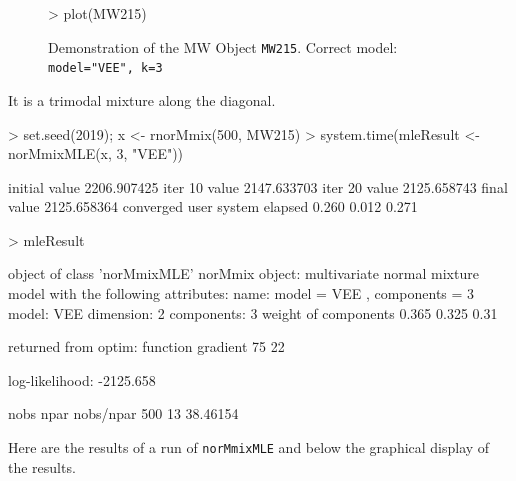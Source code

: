 \begin{figure}
    \begin{Rgraph}[0.9]
\begin{Schunk}
\begin{Sinput}
>     plot(MW215)
\end{Sinput}
\end{Schunk}
    \caption{Demonstration of the MW Object {\tt MW215}. Correct model: 
             {\tt model="VEE", k=3}}
    \label{fig:demoMW}
    \end{Rgraph}
\end{figure}

It is a trimodal mixture along the diagonal.

\begin{Schunk}
\begin{Sinput}
>     set.seed(2019); x <- rnorMmix(500, MW215)
>     system.time(mleResult <- norMmixMLE(x, 3, "VEE"))
\end{Sinput}
\begin{Soutput}
initial  value 2206.907425 
iter  10 value 2147.633703
iter  20 value 2125.658743
final  value 2125.658364 
converged
   user  system elapsed 
  0.260   0.012   0.271 
\end{Soutput}
\begin{Sinput}
>     mleResult
\end{Sinput}
\begin{Soutput}
object of class 'norMmixMLE' 
norMmix object: 
multivariate normal mixture model with the following attributes:
name: 		 model = VEE , components = 3 
 model: 		 VEE 
 dimension:	 2 
 components:	 3 
weight of components 0.365 0.325 0.31 

returned from optim:
function gradient 
      75       22 

log-likelihood: -2125.658 
 
 nobs	npar	nobs/npar
 500 	 13 	 38.46154 
\end{Soutput}
\end{Schunk}

Here are the results of a run of {\tt norMmixMLE} and below the graphical 
display of the results.


